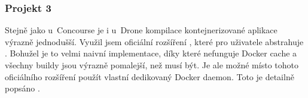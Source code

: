         \subsubsection{Projekt 3}
            Stejně jako u~Concourse je i u~Drone kompilace kontejnerizované aplikace výrazně jednodušší. Využil jsem oficiální rozšíření , které pro uživatele abstrahuje . Bohužel je to velmi naivní implementace, díky které nefunguje Docker cache a všechny buildy jsou výrazně pomalejší, než musí být. Je ale možné místo tohoto oficiálního rozšíření použít vlastní dedikovaný Docker daemon. Toto je detailně popsáno .
